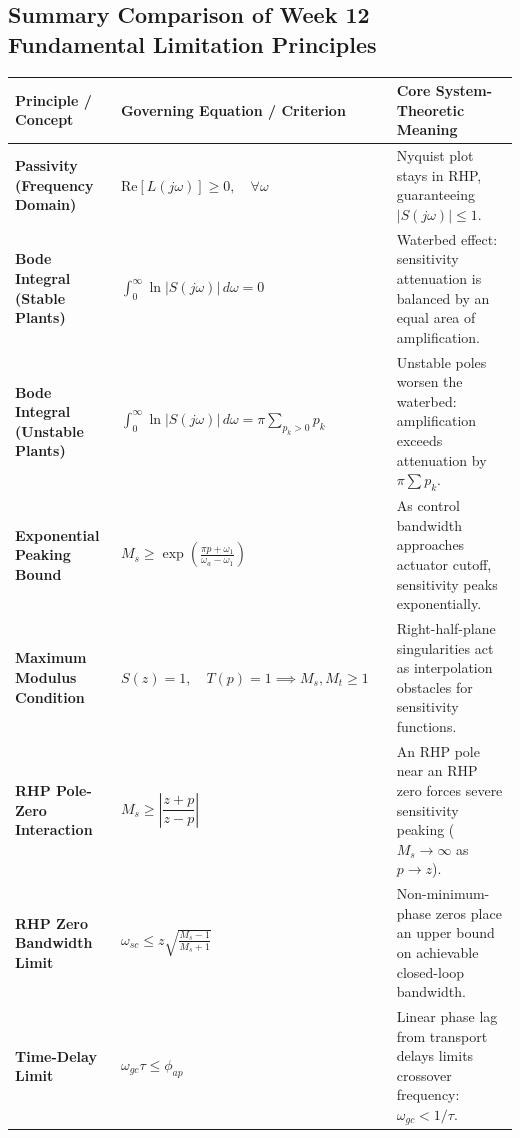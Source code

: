 \documentclass[12pt,onecolumn,twoside ]{article}
\begin{document}
	\subsection{Summary Comparison of Week 12 Fundamental Limitation Principles}
	\begin{center}\small\begin{tabularx}{\textwidth}{L{0.8} L{1.1} L{1.1}}
			\toprule
			\textbf{Principle / Concept} & \textbf{Governing Equation / Criterion} & \textbf{Core System-Theoretic Meaning} \\
			\midrule
			\textbf{Passivity (Frequency Domain)} & $\text{Re}[L(j\omega)] \ge 0, \quad \forall \omega$ & Nyquist plot stays in RHP, guaranteeing $\lvert S(j\omega)\rvert \le 1$. \\
			\textbf{Bode Integral (Stable Plants)} & $\int_{0}^{\infty} \ln \lvert S(j\omega)\rvert \, d\omega = 0$ & Waterbed effect: sensitivity attenuation is balanced by an equal area of amplification. \\
			\textbf{Bode Integral (Unstable Plants)} & $\int_{0}^{\infty} \ln \lvert S(j\omega)\rvert \, d\omega = \pi \sum_{p_k > 0} p_k$ & Unstable poles worsen the waterbed: amplification exceeds attenuation by $\pi \sum p_k$. \\
			\textbf{Exponential Peaking Bound} & $M_s \ge \exp\left(\frac{\pi p + \omega_1}{\omega_a - \omega_1}\right) \quad$ & As control bandwidth approaches actuator cutoff, sensitivity peaks exponentially. \\
			\textbf{Maximum Modulus Condition} & $S(z) = 1, \quad T(p) = 1 \implies M_s, M_t \ge 1 \quad$ & Right-half-plane singularities act as interpolation obstacles for sensitivity functions. \\
			\textbf{RHP Pole-Zero Interaction} & $M_s \ge \left\lvert \dfrac{z + p}{z - p} \right\rvert$ & An RHP pole near an RHP zero forces severe sensitivity peaking ($M_s \to \infty$ as $p \to z$). \\
			\textbf{RHP Zero Bandwidth Limit} & $\omega_{sc} \le z \sqrt{\frac{M_s - 1}{M_s + 1}} \quad$ & Non-minimum-phase zeros place an upper bound on achievable closed-loop bandwidth. \\
			\textbf{Time-Delay Limit} & $\omega_{gc} \tau \le \phi_{ap} \quad$ & Linear phase lag from transport delays limits crossover frequency: $\omega_{gc} < 1/\tau$. \\
			\bottomrule
	\end{tabularx}\end{center}
	
\end{document}
